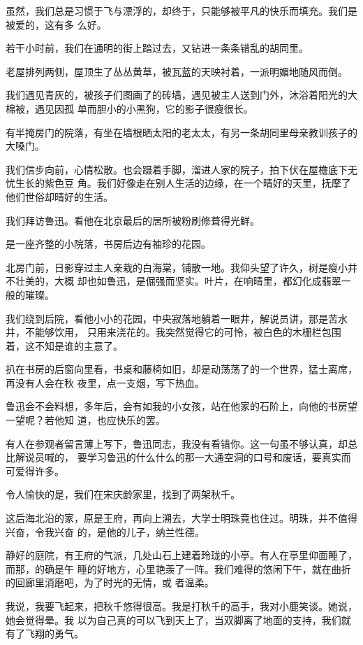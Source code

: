\documentclass[12pt,a4paper]{article}
\begin{document}
		虽然，我们总是习惯于飞与漂浮的，却终于，只能够被平凡的快乐而填充。我们是被爱的，这有多
	么好。


		若干小时前，我们在通明的街上踏过去，又钻进一条条错乱的胡同里。

		老屋排列两侧，屋顶生了丛丛黄草，被瓦蓝的天映衬着，一派明媚地随风而倒。

		我们遇见青灰的，被孩子们图画了的砖墙，遇见被主人送到门外，沐浴着阳光的大棉被，遇见因孤
	单而胆小的小黑狗，它的影子很瘦很长。

		有半掩房门的院落，有坐在墙根晒太阳的老太太，有另一条胡同里母亲教训孩子的大嗓门。

		我们信步向前，心情松散。也会蹑着手脚，溜进人家的院子，拍下伏在屋檐底下无忧生长的紫色豆
	角。我们好像走在别人生活的边缘，在一个晴好的天里，抚摩了他们世俗却晴好的生活。


		我们拜访鲁迅。看他在北京最后的居所被粉刷修葺得光鲜。

		是一座齐整的小院落，书房后边有袖珍的花园。

		北房门前，日影穿过主人亲栽的白海棠，铺散一地。我仰头望了许久，树是瘦小并不壮美的，大概
	却也如鲁迅，是倔强而坚实。叶片，在响晴里，都幻化成翡翠一般的璀璨。

		我们绕到后院，看他小小的花园，中央寂落地躺着一眼井，解说员讲，那是苦水井，不能够饮用，
	只用来浇花的。我突然觉得它的可怜，被白色的木栅栏包围着，这不知是谁的主意了。

		扒在书房的后窗向里看，书桌和藤椅如旧，却是动荡荡了的一个世界，猛士离席，再没有人会在秋
	夜里，点一支烟，写下热血。

		鲁迅会不会料想，多年后，会有如我的小女孩，站在他家的石阶上，向他的书房望一望呢？若他知
	道，也应快乐的罢。


		有人在参观者留言薄上写下，鲁迅同志，我没有看错你。这一句虽不够认真，却总比解说员喊的，
	要学习鲁迅的什么什么的那一大通空洞的口号和废话，要真实而可爱得许多。


		令人愉快的是，我们在宋庆龄家里，找到了两架秋千。

		这后海北沿的家，原是王府，再向上溯去，大学士明珠竟也住过。明珠，并不值得兴奋，令我兴奋
	的，是他的儿子，纳兰性德。

		静好的庭院，有王府的气派，几处山石上建着玲珑的小亭。有人在亭里仰面睡了，而那，的确是午
	睡的好地方，心里艳羡了一阵。我们难得的悠闲下午，就在曲折的回廊里消磨吧，为了时光的无情，或
	者温柔。

		我说，我要飞起来，把秋千悠得很高。我是打秋千的高手，我对小鹿笑谈。她说，她会觉得晕。我
	以为自己真的可以飞到天上了，当双脚离了地面的支持，我们就有了飞翔的勇气。
\end{document}
